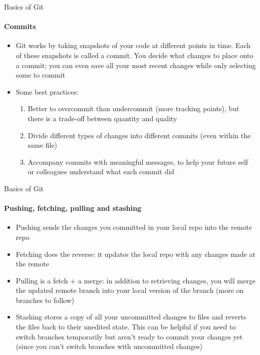 \documentclass[10pt, aspectratio=169, xcolor=dvipsnames]{beamer}
\let\olditem\item
\renewcommand{\item}{%
\olditem\vspace{0.3em}}
\begin{document}
\begin{frame}[t]{Basics of Git}
    \framesubtitle{Commits}

    \normalsize\vspace{0.5em}
    \begin{itemize}
        \item Git works by taking snapshots of your code at different points in time. Each of these snapshots is called a \alert{commit}. You decide what changes to place onto a commit; you can even save all your most recent changes while only selecting some to commit
        \item Some best practices:
        \begin{enumerate}
            \item Better to overcommit than undercommit (more tracking points), but there is a trade-off between quantity and quality
            \item Divide different types of changes into different commits (even within the same file)
            \item Accompany commits with meaningful messages, to help your future self or colleagues understand what each commit did
        \end{enumerate}
    \end{itemize}
\end{frame}

\begin{frame}[t]{Basics of Git}
    \framesubtitle{Pushing, fetching, pulling and stashing}

    \normalsize\vspace{0.5em}
    \begin{itemize}
        \item \alert{Pushing} sends the changes you committed in your local repo into the remote repo
        \item \alert{Fetching} does the reverse: it updates the local repo with any changes made at the remote
        \item \alert{Pulling} is a fetch + a merge: in addition to retrieving changes, you will merge the updated remote branch into your local version of the branch (more on branches to follow)
        \item \alert{Stashing} stores a copy of all your uncommitted changes to files and reverts the files back to their unedited state. This can be helpful if you need to switch branches temporarily but aren't ready to commit your changes yet (since you can't switch branches with uncommitted changes)
    \end{itemize}
\end{frame}
\end{document}
